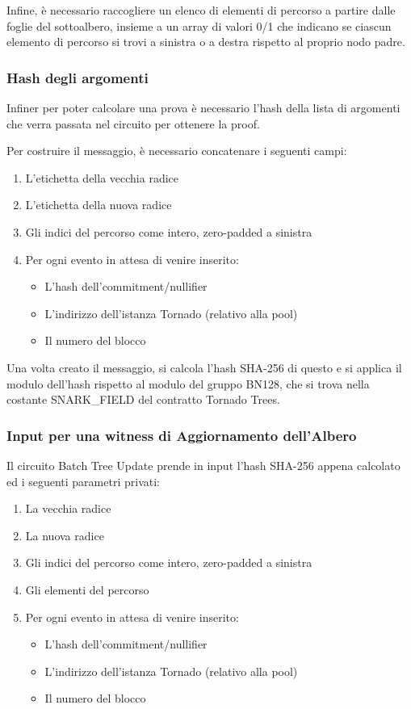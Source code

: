 Infine, è necessario raccogliere un elenco di elementi di percorso a partire dalle foglie del sottoalbero, insieme a un array di valori 0/1 che indicano se ciascun elemento di percorso si trovi a sinistra o a destra rispetto al proprio nodo padre.

\subsubsection{Hash degli argomenti}

Infiner per poter calcolare una prova è necessario l'hash della lista di argomenti che verra passata nel circuito per ottenere la proof.

Per costruire il messaggio, è necessario concatenare i seguenti campi:

\begin{enumerate}
    \item L'etichetta della vecchia radice
    \item L'etichetta della nuova radice
    \item Gli indici del percorso come intero, zero-padded a sinistra
    \item Per ogni evento in attesa di venire inserito:
    \begin{itemize}
        \item L'hash dell'commitment/nullifier
        \item L'indirizzo dell'istanza Tornado (relativo alla pool) 
        \item Il numero del blocco
    \end{itemize}
\end{enumerate}

Una volta creato il messaggio, si calcola l'hash SHA-256 di questo e si applica il modulo dell'hash rispetto al modulo del gruppo BN128, che si trova nella costante SNARK\_FIELD del contratto Tornado Trees.

\subsubsection{Input per una witness di Aggiornamento dell'Albero}

Il circuito Batch Tree Update prende in input l'hash SHA-256 appena calcolato ed i seguenti parametri privati:

\begin{enumerate}
    \item La vecchia radice
    \item La nuova radice
    \item Gli indici del percorso come intero, zero-padded a sinistra
    \item Gli elementi del percorso
    \item Per ogni evento in attesa di venire inserito:
    \begin{itemize}
        \item L'hash dell'commitment/nullifier
        \item L'indirizzo dell'istanza Tornado (relativo alla pool) 
        \item Il numero del blocco
    \end{itemize}
\end{enumerate}

